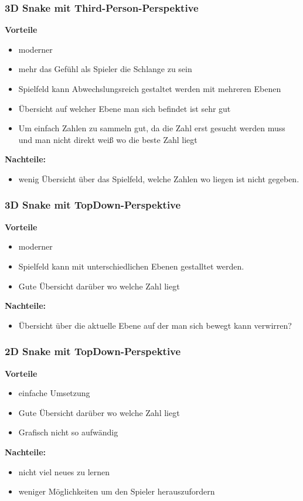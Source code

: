 \subsubsection{3D Snake mit Third-Person-Perspektive}
\textbf{Vorteile}
\begin{itemize}
\item moderner
\item mehr das Gefühl als Spieler die Schlange zu sein
\item Spielfeld kann Abwechslungsreich gestaltet werden mit mehreren Ebenen
\item Übersicht auf welcher Ebene man sich befindet ist sehr gut
\item Um einfach Zahlen zu sammeln gut, da die Zahl erst gesucht werden muss und man nicht direkt weiß wo die beste Zahl liegt
\end{itemize}
\textbf{Nachteile:}
\begin{itemize}
\item wenig Übersicht über das Spielfeld, welche Zahlen wo liegen ist nicht gegeben.
\end{itemize}
\subsubsection{3D Snake mit TopDown-Perspektive}
\textbf{Vorteile}
\begin{itemize}
\item moderner
\item Spielfeld kann mit unterschiedlichen Ebenen gestalltet werden.
\item Gute Übersicht darüber wo welche Zahl liegt
\end{itemize}
\textbf{Nachteile:}
\begin{itemize}
\item Übersicht über die aktuelle Ebene auf der man sich bewegt kann verwirren?
\end{itemize}
\subsubsection{2D Snake mit TopDown-Perspektive}
\textbf{Vorteile}
\begin{itemize}
\item einfache Umsetzung
\item Gute Übersicht darüber wo welche Zahl liegt
\item Grafisch nicht so aufwändig
\end{itemize}
\textbf{Nachteile:}
\begin{itemize}
\item nicht viel neues zu lernen
\item weniger Möglichkeiten um den Spieler herauszufordern
\end{itemize}
